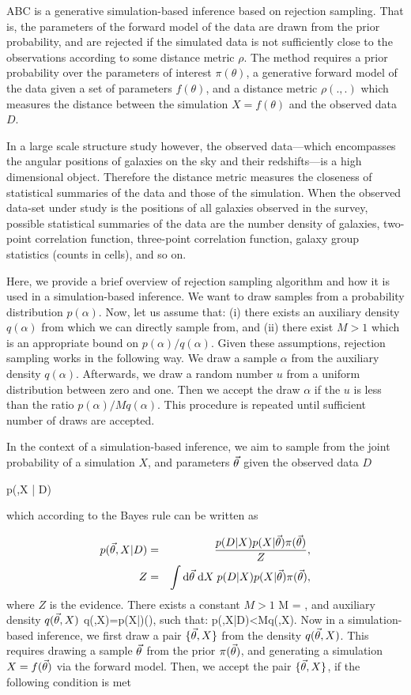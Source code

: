 ABC is a generative simulation-based inference based on rejection sampling. That is, the parameters of the forward model of the data are drawn from the prior probability, and are rejected if the simulated data is not sufficiently close to the observations according to some distance metric $\rho$. The method requires a prior probability over the parameters of interest $\pi(\theta)$, a generative forward model of the data given a set of parameters $f(\theta)$, and a distance metric $\rho(.,.)$ which measures the distance between the simulation $X=f(\theta)$ and the observed data $D$. 

In a large scale structure study however, the observed data---which encompasses the angular positions of galaxies on the sky and their redshifts---is a high dimensional object. Therefore the distance metric measures the closeness of statistical summaries of the data and those of the simulation. When the observed data-set under study is the positions of all galaxies observed in the survey, possible statistical summaries of the data are the number density of galaxies, two-point correlation function, three-point correlation function, galaxy group statistics (counts in cells), and so on.

Here, we provide a brief overview of rejection sampling algorithm and how it is used in a simulation-based inference. We want to draw samples from a probability distribution $p(\alpha)$. Now, let us assume that: (i) there exists an auxiliary density $q(\alpha)$ from which we can directly sample from, and (ii) there exist $M>1$ which is an appropriate bound on $p(\alpha)/q(\alpha)$. Given these assumptions, rejection sampling works in the following way. We draw a sample $\alpha$ from the auxiliary density $q(\alpha)$. Afterwards, we draw a random number $u$ from a uniform distribution between zero and one. Then we accept the draw $\alpha$ if the $u$ is less than the ratio $p(\alpha)/Mq(\alpha)$. This procedure is repeated until sufficient number of draws are accepted.

In the context of a simulation-based inference, we aim to sample from the joint probability of a simulation $X$, and parameters $\vec{\theta}$ given the observed data $D$

\beq
p(\pars,X | D)
\eeq

which according to the Bayes rule can be written as 

\begin{eqnarray}
p(\vec{\theta},X | D)  &=& \frac{p(D|X)p(X|\vec{\theta})\pi(\vec{\theta})}{Z},  \\
Z &=& \int \mathrm{d} \vec{\theta} \; \mathrm{d} X \; p(D|X)p(X|\vec{\theta})\pi(\vec{\theta}),
\end{eqnarray}
where $Z$ is the evidence. There exists a constant $M>1$ 
\beq 
M = ,
\eeq 
and auxiliary density $q(\vec{\theta} ,X)$
\beq 
q(\pars ,X)=p(X|\pars )\pi(\pars ),
\eeq 
such that:
\beq 
p(\pars ,X|D)<Mq(\pars ,X).
\eeq 
Now in a simulation-based inference, we first draw a pair $\{\vec{\theta} , X \}$ from the density $q(\vec{\theta} , X)$. This requires drawing a sample $\vec{\theta}$ from the prior $\pi(\vec{\theta})$, and generating a simulation $X=f(\vec{\theta})$ via the forward model. Then, we accept the pair $\{\vec{\theta} , X \}$, if the following condition is met

